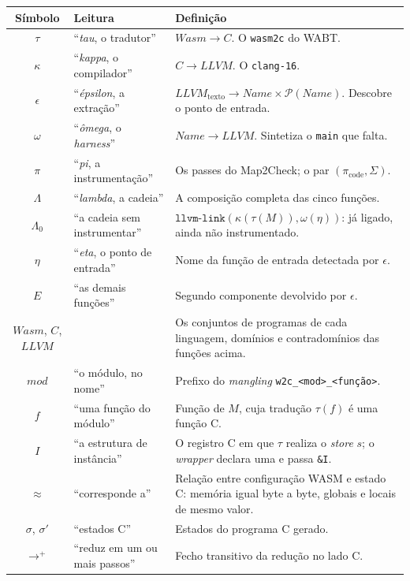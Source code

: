 \documentclass[11pt,a4paper]{article}
\theoremstyle{definition}
\newcommand{\code}[1]{\texttt{#1}}
\begin{document}
\begin{tabularx}{\textwidth}{@{}c l X@{}}
\toprule
\textbf{Símbolo} & \textbf{Leitura} & \textbf{Definição} \\
\midrule
$\tau$ & ``\emph{tau}, o tradutor'' & $\mathit{Wasm} \to \mathit{C}$. O \code{wasm2c} do WABT. \\
$\kappa$ & ``\emph{kappa}, o compilador'' & $\mathit{C} \to \mathit{LLVM}$. O \code{clang-16}. \\
$\epsilon$ & ``\emph{épsilon}, a extração'' & $\mathit{LLVM}_{\text{texto}} \to \mathit{Name} \times \mathcal{P}(\mathit{Name})$. Descobre o ponto de entrada. \\
$\omega$ & ``\emph{ômega}, o \emph{harness}'' & $\mathit{Name} \to \mathit{LLVM}$. Sintetiza o \code{main} que falta. \\
$\pi$ & ``\emph{pi}, a instrumentação'' & Os passes do Map2Check; o par $(\pi_{\text{code}}, \Sigma)$. \\
$\Lambda$ & ``\emph{lambda}, a cadeia'' & A composição completa das cinco funções. \\
$\Lambda_0$ & ``a cadeia sem instrumentar'' & $\code{llvm-link}(\kappa(\tau(M)), \omega(\eta))$: já ligado, ainda não instrumentado. \\
$\eta$ & ``\emph{eta}, o ponto de entrada'' & Nome da função de entrada detectada por $\epsilon$. \\
$E$ & ``as demais funções'' & Segundo componente devolvido por $\epsilon$. \\
$\mathit{Wasm}$, $\mathit{C}$, $\mathit{LLVM}$ &  & Os conjuntos de programas de cada linguagem, domínios e contradomínios das funções acima. \\
$\mathit{mod}$ & ``o módulo, no nome'' & Prefixo do \emph{mangling} \code{w2c\_<mod>\_<função>}. \\
$f$ & ``uma função do módulo'' & Função de $M$, cuja tradução $\tau(f)$ é uma função C. \\
$I$ & ``a estrutura de instância'' & O registro C em que $\tau$ realiza o \emph{store} $s$; o \emph{wrapper} declara uma e passa \code{\&I}. \\
$\approx$ & ``corresponde a'' & Relação entre configuração WASM e estado C: memória igual byte a byte, globais e locais de mesmo valor. \\
$\sigma$, $\sigma'$ & ``estados C'' & Estados do programa C gerado. \\
$\to^{+}$ & ``reduz em um ou mais passos'' & Fecho transitivo da redução no lado C. \\
\bottomrule
\end{tabularx}
\end{document}
